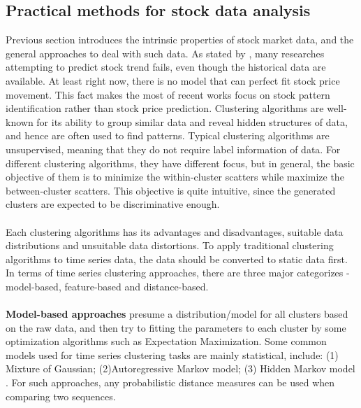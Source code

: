 \subsection{Practical methods for stock data analysis}
Previous section introduces the intrinsic properties of stock market data, and the general approaches to deal with such data. As stated by \cite{alexander2001market}, many researches attempting to predict stock trend fails, even though the historical data are available. At least right now, there is no model that can perfect fit stock price movement. This fact makes the most of recent works focus on stock pattern identification rather than stock price prediction. Clustering algorithms are well-known for its ability to group similar data and reveal hidden structures of data, and hence are often used to find patterns. Typical clustering algorithms are unsupervised, meaning that they do not require label information of data. For different clustering algorithms, they have different focus, but in general, the basic objective of them is to minimize the within-cluster scatters while maximize the between-cluster scatters. This objective is quite intuitive, since the generated clusters are expected to be discriminative enough.\\
\\Each clustering algorithms has its advantages and disadvantages, suitable data distributions and unsuitable data distortions. To apply traditional clustering algorithms to time series data, the data should be converted to static data first. In terms of time series clustering approaches, there are three major categorizes - model-based, feature-based and distance-based.\\
\\\textbf{Model-based approaches} presume a distribution/model for all clusters based on the raw data, and then try to fitting the parameters to each cluster by some optimization algorithms such as Expectation Maximization. Some common models used for time series clustering tasks are mainly statistical, include: (1) Mixture of Gaussian; (2)Autoregressive Markov model; (3) Hidden Markov model \cite{nakano2019effect}. For such approaches, any probabilistic distance measures can be used when comparing two sequences.\\
